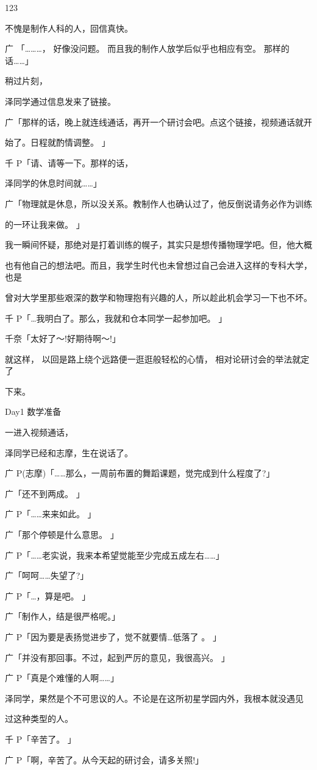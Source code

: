123\par
不愧是制作人科的人，回信真快。\par
广 「………， 好像没问题。 而且我的制作人放学后似乎也相应有空。 那样的话……」\par
稍过片刻，\par
泽同学通过信息发来了链接。\par
广「那样的话，晚上就连线通话，再开一个研讨会吧。点这个链接，视频通话就开\par
始了。日程就酌情调整。 」\par
千 P「请、请等一下。那样的话，\par
泽同学的休息时间就……」\par
广「物理就是休息，所以没关系。教制作人也确认过了，他反倒说请务必作为训练\par
的一环让我来做。 」\par
我一瞬间怀疑，那绝对是打着训练的幌子，其实只是想传播物理学吧。但，他大概\par
也有他自己的想法吧。而且，我学生时代也未曾想过自己会进入这样的专科大学， 也是\par
曾对大学里那些艰深的数学和物理抱有兴趣的人，所以趁此机会学习一下也不坏。\par
千 P「…我明白了。那么，我就和仓本同学一起参加吧。 」\par
千奈「太好了～!好期待啊～!」\par
就这样， 以回是路上绕个远路便一逛逛般轻松的心情， 相对论研讨会的举法就定了\par
下来。\par
Day1 数学准备\par
一进入视频通话，\par
泽同学已经和志摩，生在说话了。\par
广 P(志摩)「……那么，一周前布置的舞蹈课题，觉完成到什么程度了?」\par
广「还不到两成。 」\par
广 P「……来来如此。 」\par
广「那个停顿是什么意思。 」\par
广 P「……老实说，我来本希望觉能至少完成五成左右……」\par
广「呵呵……失望了?」\par
广 P「…，算是吧。 」\par
广「制作人，结是很严格呢。」\par
广 P「因为要是表扬觉进步了，觉不就要情…低落了 。 」\par
广「并没有那回事。不过，起到严厉的意见，我很高兴。 」\par
广 P「真是个难懂的人啊……」\par
泽同学，果然是个不可思议的人。不论是在这所初星学园内外，我根本就没遇见\par
过这种类型的人。\par
千 P「辛苦了。 」\par
广 P「啊，辛苦了。从今天起的研讨会，请多关照!」\par

